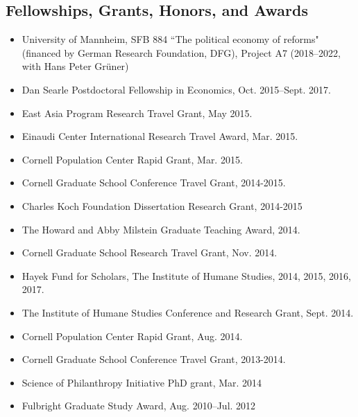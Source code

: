 \documentclass[margin, letterpaper]{res}
\begin{document}
\begin{resume}
\section{Fellowships, Grants, Honors, and Awards}
\begin{itemize}
\item University of Mannheim, SFB 884 ``The political economy of reforms" (financed by German Research Foundation, DFG), Project A7 (2018--2022, with Hans Peter Gr{\"u}ner)
\item Dan Searle Postdoctoral Fellowship in Economics, Oct. 2015--Sept. 2017.
\item East Asia Program Research Travel Grant, May 2015.
\item Einaudi Center International Research Travel Award, Mar. 2015.
\item Cornell Population Center Rapid Grant, Mar. 2015.
\item Cornell Graduate School Conference Travel Grant, 2014-2015.
\item Charles Koch Foundation Dissertation Research Grant, 2014-2015
\item The Howard and Abby Milstein Graduate Teaching Award, 2014.
\item Cornell Graduate School Research Travel Grant, Nov. 2014.
\item Hayek Fund for Scholars, The Institute of Humane Studies, 2014, 2015, 2016, 2017.
\item The Institute of Humane Studies Conference and Research Grant, Sept. 2014.
\item Cornell Population Center Rapid Grant, Aug. 2014.
\item Cornell Graduate School Conference Travel Grant, 2013-2014.
\item Science of Philanthropy Initiative PhD grant, Mar. 2014
\item Fulbright Graduate Study Award, Aug. 2010--Jul. 2012
\end{itemize}


\end{resume}
\end{document}
